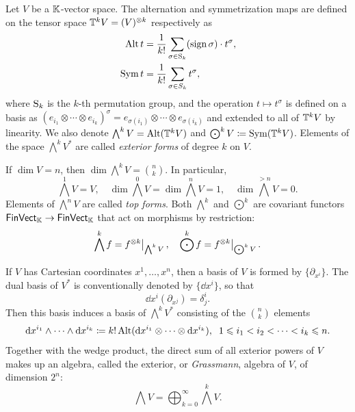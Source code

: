 \begin{defn}
    Let $V$ be a $\mathbb{K}$-vector space. The alternation and symmetrization maps are defined on the tensor space $\mathbb{T}^k V=(V)^{\otimes k}$ respectively as
    \begin{align}
        \operatorname{Alt} t&=\frac{1}{k!}\sum_{\sigma\in \mathrm{S}_k} (\operatorname{sign}\sigma)\cdot t^\sigma,\\
        \operatorname{Sym} t&=\frac{1}{k!}\sum_{\sigma\in S_k} t^\sigma,\label{def sym operator}
    \end{align}
    where $\mathrm{S}_k$ is the $k$-th permutation group, and the operation $t\mapsto t^\sigma$ is defined on a basis as $(e_{i_1}\otimes\cdots\otimes e_{i_k})^\sigma=e_{\sigma(i_1)}\otimes\cdots\otimes e_{\sigma(i_k)}$ and extended to all of $\mathbb{T}^k V$ by linearity. We also denote $\bigwedge^k V=\operatorname{Alt}(\mathbb{T}^k V)$ and $\bigodot^k V\coloneqq \operatorname{Sym}(\mathbb{T}^k V)$. Elements of the space $\bigwedge^k V^\ast$ are called \emph{exterior forms} of degree $k$ on $V$. 
    
    If $\dim V=n$, then $\dim \bigwedge^k V=\binom{n}{k}$. In particular, 
    \[\bigwedge^1 V=V,\quad \dim \bigwedge^0 V=\dim \bigwedge^n V=1,\quad \dim \bigwedge^{>n} V=0.\]
    Elements of $\bigwedge^n V$ are called \emph{top forms}.
    Both $\bigwedge^k$ and $\bigodot^k$ are covariant functors $\mathsf{FinVect}_{\mathbb{K}}\to\mathsf{FinVect}_{\mathbb{K}}$ that act on morphisms by restriction: \[\bigwedge^k f=\restr{f^{\otimes k}}{\bigwedge^k V},\quad \bigodot^k f=\restr{f^{\otimes k}}{\bigodot^k V}.\]
\end{defn}

If $V$ has Cartesian coordinates $x^1,\ldots,x^n$, then a basis of $V$ is formed by $\{\partial_{x^i}\}$. The dual basis of $V^\ast$ is conventionally denoted by $\{\dd x^i\}$, so that
\[
    \dd x^i\left(\partial_{x^j}\right)=\delta^i_j.
\]
Then this basis induces a basis of $\bigwedge^k V^\ast$ consisting of the $\binom{n}{k}$ elements
\[
{\mathrm{d}} x^{i_1}\wedge \cdots \wedge {\mathrm{d}} x^{i_k}\coloneqq k!\operatorname{Alt}({\mathrm{d}} x^{i_1}\otimes\cdots\otimes {\mathrm{d}} x^{i_k}),\;\;1\leqslant i_1<i_2<\cdots<i_k\leqslant n.
\]
Together with the wedge product, the direct sum of all exterior powers of $V$ makes up an algebra, called the exterior, or \emph{Grassmann}, algebra of $V$, of dimension $2^n$:
\[\bigwedge V=\bigoplus_{k=0}^\infty \bigwedge^k V.\]



